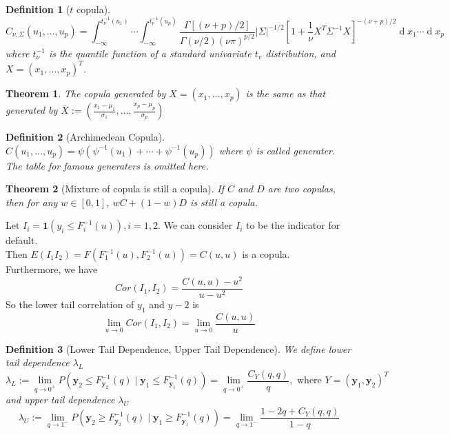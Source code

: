 \documentclass[11pt]{article}
\newtheorem{definition}{Definition}[section]
\newtheorem{theorem}{Theorem}[section]
\theoremstyle{definition}
\DeclareMathOperator{\diff}{d}
\begin{document}
\begin{definition}[{$t$} copula]
\normalfont 
\[
C_{\nu, \Sigma}(u_1,\ldots, u_p)=\int_{-\infty}^{t_\nu^{-1}(u_1)}\cdots \int_{-\infty}^{t_\nu^{-1}(u_p)}\frac{\Gamma[(\nu+p)/2]}{\Gamma(\nu/2)(\nu\pi)^{p/2}}|\Sigma|^{-1/2}[1+\frac{1}{\nu}X^T\Sigma^{-1}X]^{-(\nu+p)/2}\diff x_1\cdots \diff x_p
\]
where $t_\nu^{-1}$ is the quantile function of a standard univariate $t_v$ distribution, and $X = (x_1,\ldots, x_p)^T$.
\end{definition}
\begin{theorem}
\normalfont The copula generated by $X=(x_1,\ldots, x_p)$ is the same as that generated by $\bar{X}:=(\frac{x_1-\mu_1}{\sigma_1}, \ldots, \frac{x_p-\mu_p}{\sigma_p})$
\end{theorem}
\begin{definition}[Archimedean Copula]
\normalfont $C(u_1,\ldots, u_p)=\psi(\psi^{-1}(u_1) +\cdots + \psi^{-1}(u_p))$ where $\psi$ is called \textit{generater}.\\
The table for famous generaters is omitted here.
\end{definition}
\begin{theorem}[Mixture of copula is still a copula]
\normalfont If $C$ and $D$ are two copulas, then for any $w\in[0,1]$, $wC+(1-w)D$ is still a copula.
\end{theorem}
Let $I_i = \mathbf{1}(y_i\leq F_i^{-1}(u)), i = 1,2$. We can consider $I_i$ to be the indicator for default.\\
Then $E(I_1I_2) = F(F_1^{-1}(u), F_2^{-1}(u)) = C(u,u)$ is a copula.\\
Furthermore, we have
\[
Cor(I_1, I_2) = \frac{C(u,u)-u^2}{u-u^2}
\]
So the lower tail correlation of $y_1$ and $y-2$ is
\[
\lim_{u\to 0} Cor(I_1,I_2)=\lim_{u\to 0}\frac{C(u,u)}{u}
\]
\begin{definition}[Lower Tail Dependence, Upper Tail Dependence]
\normalfont We define lower tail dependence $\lambda_L$ 
\[
\lambda_L := \lim_{q\to 0^+}P(\mathbf{y}_2\leq F_{\mathbf{y}_2}^{-1}(q)\mid \mathbf{y}_1\leq F_{\mathbf{y}_1}^{-1}(q)) = \lim_{q\to 0^+}\frac{C_Y(q,q)}{q},\text{ where }Y=(\mathbf{y}_1,\mathbf{y}_2)^T
\]
and upper tail dependence $\lambda_U$
\[
\lambda_U:=\lim_{q\to 1^-}P(\mathbf{y}_2\geq F_{\mathbf{y}_2}^{-1}(q)\mid \mathbf{y}_1\geq F_{\mathbf{y}_1}^{-1}(q)) =\lim_{q\to 1^{-}}\frac{1-2q + C_Y(q,q)}{1-q}
\]
\end{definition}
\end{document}
